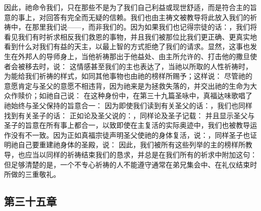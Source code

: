 因此，祂命令我们，只在那些不是为了我们自己利益或现世舒适，而是符合主的旨意的事上，对回答有完全而无疑的信赖。我们也由主祷文被教导将此放入我们的祈祷中，在那里我们说——，而非我们的。因为如果我们也记得宗徒的话：，我们将看见我们有时祈求相反我们救恩的事物，并且我们被那位比我们更正确、更真实地看到什么对我们有益的天主，以最上智的方式拒绝了我们的请求。显然，这事也发生在外邦人的导师身上，当他祈祷那出于他益处、由主所允许的、打击他的撒旦使者会被移去时，说： 这情感甚至我们的主也表达了，当祂以所取的人性祈祷时，为能给我们祈祷的样式，如同其他事物也由祂的榜样所赐予；这样说： 尽管祂的意愿肯定与圣父的意愿不相违背，因为祂来是为拯救失落的，并交出祂的生命为大众作赎价；如祂自己说： 在这种身份中，在第三十九篇圣咏中，真福达味歌唱了祂始终与圣父保持的旨意合一： 因为即使我们读到有关圣父的话：，我们也同样找到有关圣子的话： 正如论及圣父说的：，同样论及圣子记载： 并且显示圣父与圣子的旨意在所有事上都合一，以致即使在主复活的实际奥迹中，我们也被教导运作没有不一致。因为正如真福宗徒声明圣父使祂的身体复活，说：，同样圣子也证明祂自己要重建祂身体的圣殿，说： 因此，我们被所有这些列举的主的榜样所教导，也应当以同样的祈祷结束我们的恳求，并总是在我们所有的祈求中附加这句： 但足够清楚的是，一个不专心祈祷的人不能遵守通常在弟兄集会中、在礼仪结束时所做的三重敬礼。\par


\subsection{第三十五章}

\par


